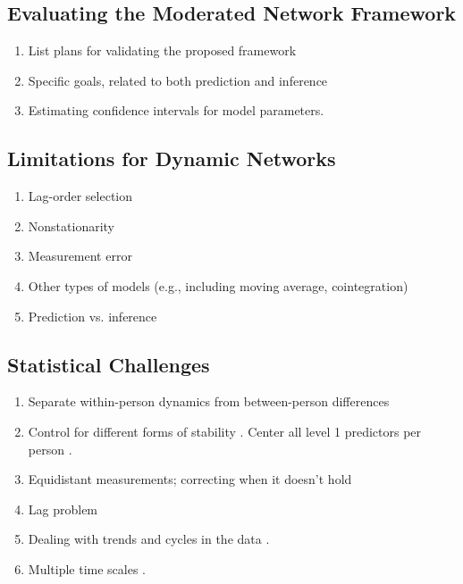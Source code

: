 \subsection{Evaluating the Moderated Network Framework}
\begin{enumerate}
    \item List plans for validating the proposed framework
    \item Specific goals, related to both prediction and inference
    \item Estimating confidence intervals for model parameters.
\end{enumerate}
\subsection{Limitations for Dynamic Networks}
\begin{enumerate}
    \item Lag-order selection
    \item Nonstationarity
    \item Measurement error
    \item Other types of models (e.g., including moving average, cointegration)
    \item Prediction vs. inference
\end{enumerate}
\subsection{Statistical Challenges}
\begin{enumerate}
    \item Separate within-person dynamics from between-person differences
    \item Control for different forms of stability \cite{eichler2012causal} \cite{hamaker2015critique}. Center all level 1 predictors per person \cite{bolger2013intensive,raudenbush2002hlm}. 
    \item Equidistant measurements; correcting when it doesn't hold \cite{boker2010glla}
    \item Lag problem
    \item Dealing with trends \cite{wang2015disaggregating} and cycles in the data \cite{liu2016weekly}.
    \item Multiple time scales \cite{kramer2014time,wichers2014dynamic}.
\end{enumerate}


